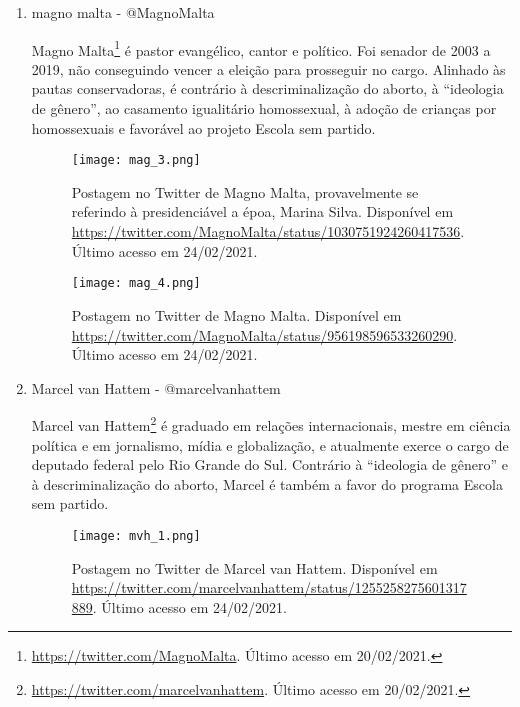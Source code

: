 \documentclass[
	12pt,				%
	openright,			%
	twoside,			%
	a4paper,			%
	english,			%
	brazil				%
	]{abntex2}
\begin{document}
\begin{anexosenv}
\begin{enumerate}
 \begin{figure}[!htbp]
    \centering
    \texttt{[image: luic\_1.png]}
    \caption{Postagem no Twitter de LUIZ CAMARGO vlog. Disponível em \url{https://twitter.com/LuizCamargoVlog/status/1361401079100043264}. Último acesso em 24/02/2021.}
 \end{figure}
 
 \newpage
  
 \item magno malta - @MagnoMalta
 
 Magno Malta\footnote{\url{https://twitter.com/MagnoMalta}. Último acesso em 20/02/2021.} é pastor evangélico, cantor e político. Foi senador de 2003 a 2019, não conseguindo vencer a eleição para prosseguir no cargo. Alinhado às pautas conservadoras, é contrário à descriminalização do aborto, à ``ideologia de gênero'', ao casamento igualitário homossexual, à adoção de crianças por homossexuais e favorável ao projeto Escola sem partido.
 
 \begin{figure}[!htbp]
    \centering
    \texttt{[image: mag\_3.png]}
    \caption{Postagem no Twitter de Magno Malta, provavelmente se referindo à presidenciável a époa, Marina Silva. Disponível em \url{https://twitter.com/MagnoMalta/status/1030751924260417536}. Último acesso em 24/02/2021.}
 \end{figure}
 
 \begin{figure}[!htbp]
    \centering
    \texttt{[image: mag\_4.png]}
    \caption{Postagem no Twitter de Magno Malta. Disponível em \url{https://twitter.com/MagnoMalta/status/956198596533260290}. Último acesso em 24/02/2021.}
 \end{figure}
  
  \newpage
  
 \item Marcel van Hattem - @marcelvanhattem
 
 Marcel van Hattem\footnote{\url{https://twitter.com/marcelvanhattem}. Último acesso em 20/02/2021.} é graduado em relações internacionais, mestre em ciência política e em jornalismo, mídia e globalização, e atualmente exerce o cargo de deputado federal pelo Rio Grande do Sul. Contrário à ``ideologia de gênero'' e à descriminalização do aborto, Marcel é também a favor do programa Escola sem partido.
 
 \begin{figure}[!htbp]
    \centering
    \texttt{[image: mvh\_1.png]}
    \caption{Postagem no Twitter de Marcel van Hattem. Disponível em \url{https://twitter.com/marcelvanhattem/status/1255258275601317889}. Último acesso em 24/02/2021.}
 \end{figure}
 

\end{enumerate}
\end{anexosenv}
\end{document}
